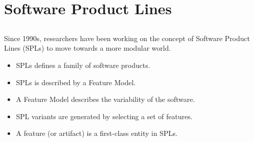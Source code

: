 \documentclass[9pt,xcolor=table,svgnames]{beamer}
\begin{document}

\section[SPLs]{Software Product Lines}
\subsection[ ]{}

\begin{frame}{\secname}
    \framesubtitle{\subsecname}

    Since 1990s, researchers have been working on the concept of \alert{Software Product Lines} (SPLs) to move towards a more \alert{modular} world.

    \bigskip
    \pause

    \begin{itemize}
        \item SPLs defines a \alert{family} of software products.
        \item SPLs is described by a \alert{Feature Model}.
        \item A Feature Model describes the \alert{variability} of the software.
        \item SPL \alert{variants} are generated by selecting a set of features.
        \item A \alert{feature} (or \alert{artifact}) is a first-class entity in SPLs.
    \end{itemize}
\end{frame}
\end{document}
